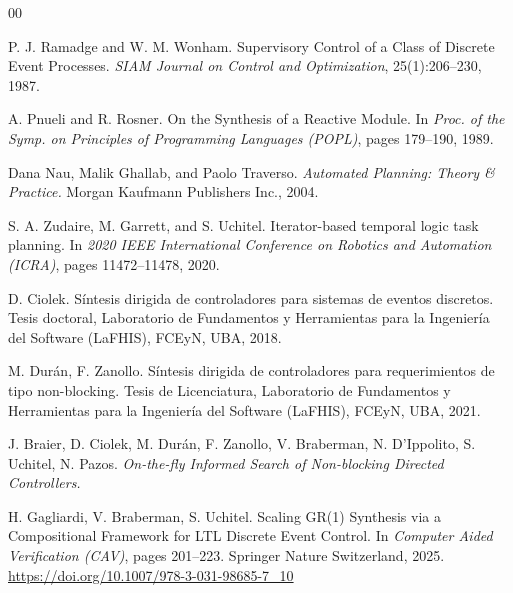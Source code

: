 \begin{thebibliography}{00}


   P. J. Ramadge and W. M. Wonham. Supervisory Control of a Class of Discrete Event Processes. \textit{SIAM Journal on Control and Optimization}, 25(1):206--230, 1987.

   A. Pnueli and R. Rosner. On the Synthesis of a Reactive Module. In \textit{Proc. of the Symp. on Principles of Programming Languages (POPL)}, pages 179--190, 1989.

   Dana Nau, Malik Ghallab, and Paolo Traverso. \textit{Automated Planning: Theory \& Practice.} Morgan Kaufmann Publishers Inc., 2004.

   S. A. Zudaire, M. Garrett, and S. Uchitel. Iterator-based temporal logic task planning. In \textit{2020 IEEE International Conference on Robotics and Automation (ICRA)}, pages 11472--11478, 2020.

   D. Ciolek. Síntesis dirigida de controladores para sistemas de eventos discretos. Tesis doctoral, Laboratorio de Fundamentos y Herramientas para la Ingeniería del Software (LaFHIS), FCEyN, UBA, 2018.

   M. Durán, F. Zanollo. Síntesis dirigida de controladores para requerimientos de tipo non-blocking. Tesis de Licenciatura, Laboratorio de Fundamentos y Herramientas para la Ingeniería del Software (LaFHIS), FCEyN, UBA, 2021.

   J. Braier, D. Ciolek, M. Durán, F. Zanollo, V. Braberman, N. D'Ippolito, S. Uchitel, N. Pazos. \textit{On-the-fly Informed Search of Non-blocking Directed Controllers.}


   H. Gagliardi, V. Braberman, S. Uchitel. Scaling GR(1) Synthesis via a Compositional Framework for LTL Discrete Event Control. In \textit{Computer Aided Verification (CAV)}, pages 201--223. Springer Nature Switzerland, 2025. \url{https://doi.org/10.1007/978-3-031-98685-7_10}


\end{thebibliography}
